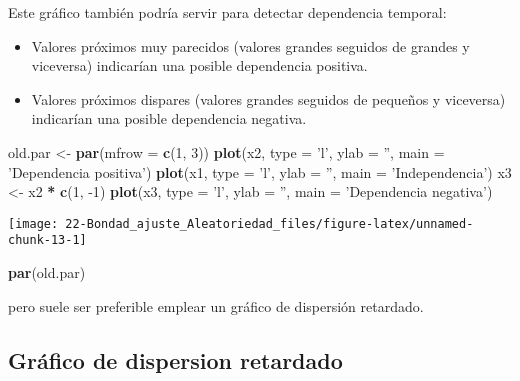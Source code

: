 \documentclass[
]{book}
\newenvironment{Shaded}{\begin{snugshade}}{\end{snugshade}}
\newcommand{\DataTypeTok}[1]{\textcolor[rgb]{0.13,0.29,0.53}{#1}}
\newcommand{\DecValTok}[1]{\textcolor[rgb]{0.00,0.00,0.81}{#1}}
\newcommand{\KeywordTok}[1]{\textcolor[rgb]{0.13,0.29,0.53}{\textbf{#1}}}
\newcommand{\NormalTok}[1]{#1}
\newcommand{\OperatorTok}[1]{\textcolor[rgb]{0.81,0.36,0.00}{\textbf{#1}}}
\newcommand{\StringTok}[1]{\textcolor[rgb]{0.31,0.60,0.02}{#1}}
\theoremstyle{break}
\theoremstyle{definition}
\theoremstyle{definition}
\theoremstyle{definition}
\theoremstyle{remark}
\begin{document}
Este gráfico también podría servir para detectar dependencia temporal:

\begin{itemize}
\item
  Valores próximos muy parecidos (valores grandes seguidos de grandes
  y viceversa) indicarían una posible dependencia positiva.
\item
  Valores próximos dispares (valores grandes seguidos de pequeños
  y viceversa) indicarían una posible dependencia negativa.
\end{itemize}

\begin{Shaded}
\begin{Highlighting}[]
\NormalTok{old.par <-}\StringTok{ }\KeywordTok{par}\NormalTok{(}\DataTypeTok{mfrow =} \KeywordTok{c}\NormalTok{(}\DecValTok{1}\NormalTok{, }\DecValTok{3}\NormalTok{))}
\KeywordTok{plot}\NormalTok{(x2, }\DataTypeTok{type =} \StringTok{'l'}\NormalTok{, }\DataTypeTok{ylab =} \StringTok{''}\NormalTok{, }\DataTypeTok{main =} \StringTok{'Dependencia positiva'}\NormalTok{)}
\KeywordTok{plot}\NormalTok{(x1, }\DataTypeTok{type =} \StringTok{'l'}\NormalTok{, }\DataTypeTok{ylab =} \StringTok{''}\NormalTok{, }\DataTypeTok{main =} \StringTok{'Independencia'}\NormalTok{)}
\NormalTok{x3 <-}\StringTok{ }\NormalTok{x2 }\OperatorTok{*}\StringTok{ }\KeywordTok{c}\NormalTok{(}\DecValTok{1}\NormalTok{, }\DecValTok{-1}\NormalTok{)}
\KeywordTok{plot}\NormalTok{(x3, }\DataTypeTok{type =} \StringTok{'l'}\NormalTok{, }\DataTypeTok{ylab =} \StringTok{''}\NormalTok{, }\DataTypeTok{main =} \StringTok{'Dependencia negativa'}\NormalTok{)}
\end{Highlighting}
\end{Shaded}

\begin{center}\texttt{[image: 22-Bondad\_ajuste\_Aleatoriedad\_files/figure-latex/unnamed-chunk-13-1]} \end{center}

\begin{Shaded}
\begin{Highlighting}[]
\KeywordTok{par}\NormalTok{(old.par)}
\end{Highlighting}
\end{Shaded}

pero suele ser preferible emplear un gráfico de dispersión retardado.

\hypertarget{gruxe1fico-de-dispersion-retardado}{%
\subsection{Gráfico de dispersion retardado}\label{gruxe1fico-de-dispersion-retardado}}
\end{document}
